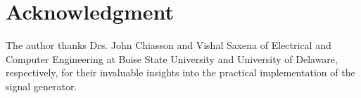 \section{Acknowledgment}

The author thanks Drs. John Chiasson and Vishal Saxena of Electrical and
Computer Engineering at Boise State University and University of Delaware,
respectively, for their invaluable insights into the practical implementation of
the signal generator.
